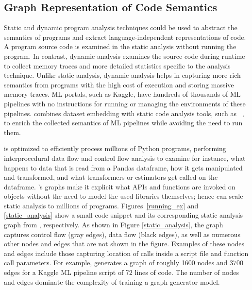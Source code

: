 



\subsection{Graph Representation of Code Semantics}
\label{sec:static}

Static and dynamic program analysis techniques could be used to abstract the semantics of programs and extract language-independent representations of code. A program source code is examined in the static analysis without running the program. In contrast, dynamic analysis examines the source code during runtime to collect memory traces and more detailed statistics specific to the analysis technique. Unlike static analysis, dynamic analysis helps in capturing more rich semantics from programs with the high cost of execution and storing massive memory traces. ML portals, such as Kaggle, have hundreds of thousands of ML pipelines with no instructions for running or managing the environments of these pipelines. {\sysname} combines dataset embedding with static code analysis tools, such as {\sysGC}~\cite{graph4code}, to enrich the collected semantics of ML pipelines while avoiding the need to run them.  





{\sysGC} is optimized to efficiently process millions of Python programs, performing interprocedural data flow and control flow analysis to examine for instance, what happens to data that is read from a Pandas dataframe, how it gets manipulated and transformed, and what transformers or estimators get called on the dataframe.  {\sysGC}'s graphs make it explicit what APIs and functions are invoked on objects without the need to model the used  libraries themselves; hence {\sysGC} can scale static analysis to millions of programs. 
Figures~\ref{running_ex} and \ref{static_analysis} show a small code snippet and its corresponding static analysis graph from {\sysGC}, respectively. As shown in Figure \ref{static_analysis}, the graph captures control flow (gray edges), data flow (black edges), as well as numerous other nodes and edges that are not shown in the figure. Examples of these nodes and edges include those capturing location of calls inside a script file and function call parameters. For example, {\sysGC} generates a graph of roughly 1600 nodes and 3700 edges for a Kaggle ML pipeline script of 72 lines of code. The number of nodes and edges dominate the complexity of training a graph generator model. 

